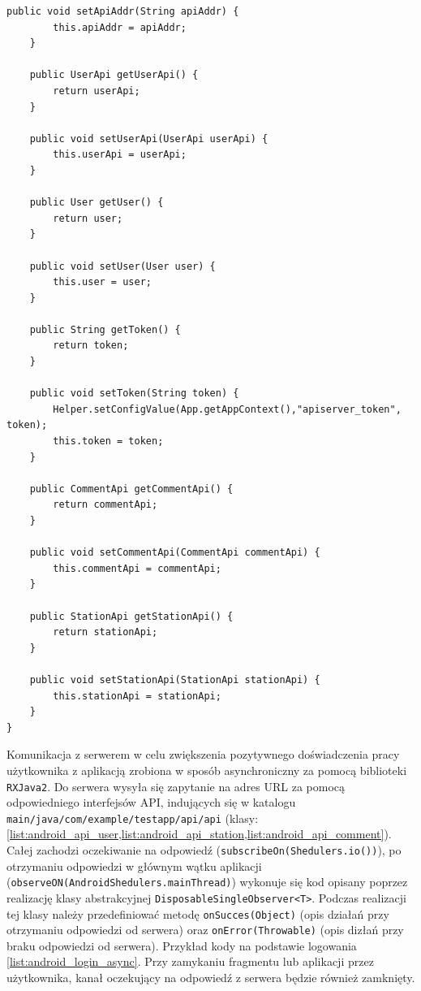 \begin{lstlisting}[label=list:android_elchargeservice,caption=obsługa komunikacji z częścią serwerową,basicstyle=\tiny\ttfamily]
    public void setApiAddr(String apiAddr) {
        this.apiAddr = apiAddr;
    }

    public UserApi getUserApi() {
        return userApi;
    }

    public void setUserApi(UserApi userApi) {
        this.userApi = userApi;
    }

    public User getUser() {
        return user;
    }

    public void setUser(User user) {
        this.user = user;
    }

    public String getToken() {
        return token;
    }

    public void setToken(String token) {
        Helper.setConfigValue(App.getAppContext(),"apiserver_token", token);
        this.token = token;
    }

    public CommentApi getCommentApi() {
        return commentApi;
    }

    public void setCommentApi(CommentApi commentApi) {
        this.commentApi = commentApi;
    }
    
    public StationApi getStationApi() {
        return stationApi;
    }

    public void setStationApi(StationApi stationApi) {
        this.stationApi = stationApi;
    }
}
\end{lstlisting}

\label{text:android_api_service}
Komunikacja z serwerem w celu zwiększenia pozytywnego doświadczenia pracy użytkownika z aplikacją zrobiona w sposób asynchroniczny za pomocą biblioteki \texttt{RXJava2}.
Do serwera wysyła się zapytanie na adres URL za pomocą odpowiedniego interfejsów API, indujących się w katalogu \texttt{main/java/com/example/testapp/api/api} (klasy: \ref{list:android_api_user,list:android_api_station,list:android_api_comment}).
Całej zachodzi oczekiwanie na odpowiedź (\texttt{subscribeOn(Shedulers.io())}), po otrzymaniu odpowiedzi w głównym wątku aplikacji (\texttt{observeON(AndroidShedulers.mainThread)}) wykonuje się kod opisany poprzez realizację klasy abstrakcyjnej \texttt{DisposableSingleObserver<T>}. Podczas realizacji tej klasy należy przedefiniować metodę \texttt{onSucces(Object)} (opis działań przy otrzymaniu odpowiedzi od serwera) oraz \texttt{onError(Throwable)} (opis dizłań przy braku odpowiedzi od serwera).
Przykład kody na podstawie logowania \ref{list:android_login_async}. Przy zamykaniu fragmentu lub aplikacji przez użytkownika, kanał oczekujący na odpowiedź z serwera będzie również zamknięty.

